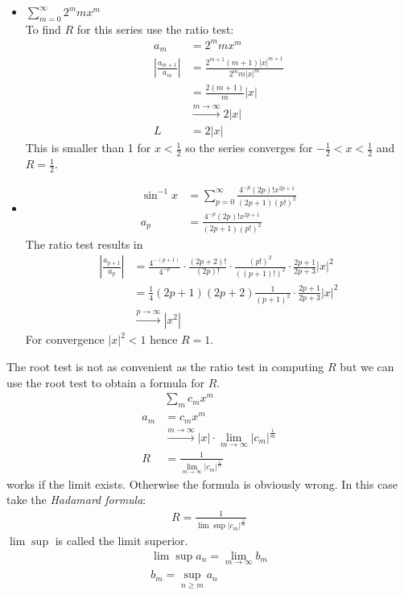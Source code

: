 \begin{ex}
	\begin{itemize}
		\item
		$ \displaystyle
		\sum_{m=0}^\infty 2^m m x^m 
		$ \\
		To find $R$ for this series use the ratio test:
		\begin{align*}
		a_m & = 2^m m x^m \\
		\left| \frac{a_{m+1}}{a_m} \right| & = \frac{2^{m+1}(m+1) |x|^{m+1}}{2^m m |x|^m} \\
		& = \frac{2(m+1)} m |x| \\
		& \overset{m \to \infty}{\to} 2|x| \\
		L & = 2|x|  
		\end{align*}
		This is smaller than 1 for $x < \frac 1 2$ so the series converges for $-\frac 1 2 < x < \frac 1 2$ and $R= \frac 1 2$.
		\item
		\begin{align*}
		\sin^{-1} x & = \sum_{p=0}^\infty \frac{4^{-p}(2p)! x^{2p+1}}{(2p+1)(p!)^2} \\
		a_p & = \frac{4^{-p}(2p)! x^{2p+1}}{(2p+1)(p!)^2}
		\end{align*}
		The ratio test results in 
		\begin{align*}
		\left| \frac{a_{p+1}}{a_p} \right| & = \frac{4^{-(p+1)}}{4^{-p}} \cdot \frac{(2p+2)!}{(2p)!} \cdot \frac{(p!)^2}{((p+1)!)^2} \cdot \frac{2p+1}{2p+3} |x|^2 \\
		& = \frac 1 4 ( 2p+1) (2p+2) \frac 1 {(p+1)^2} \cdot \frac{2p+1}{2p+3} |x|^2 \\
		& \overset{p \to \infty}{\to} \left|x^2 \right|
		\end{align*}
		For convergence $|x|^2<1$ hence $R=1$. 
	\end{itemize}
\end{ex}
The root test is not as convenient as the ratio test in computing $R$ but we can use the root test to obtain a formula for $R$.
\begin{align*}
& \sum_m c_m x^m \\
a_m & = c_m x^m \\
& \overset{m \to \infty}{\to} |x| \cdot \lim_{m\to\infty} |c_m|^{\frac 1 m} \\
R & = \frac 1 {\lim_{m \to\infty} |c_m|^{\frac 1 m}}
\end{align*}
works if the limit exists. Otherwise the formula is obviously wrong. In this case take the \emph{Hadamard formula}:
\begin{align*}
R = \frac 1 {\lim \sup |c_m|^{\frac 1 m}}
\end{align*} 
$\lim\sup$ is called the limit superior.
\begin{align*}
\lim \sup a_n = \lim_{m\to\infty} b_m \\
b_m = \underset{n \ge m}{\sup} a_n
\end{align*}

